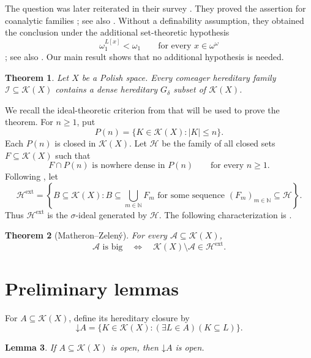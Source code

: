 \documentclass[10pt,a4paper]{amsart}
\newtheorem{theorem}{Theorem}[section]
\newtheorem{lemma}[theorem]{Lemma}
\newcommand{\K}{\mathcal K}
\newcommand{\HH}{\mathcal H}
\newcommand{\I}{\mathcal I}
\newcommand{\down}[1]{\mathord{\downarrow}\!#1}
\begin{document}
The question was later reiterated in their survey
\cite[Problem~6.9]{MZ07}. They proved the assertion for coanalytic families
\cite[Theorem~2.2]{MZ05}; see also \cite[Theorem~5.11]{MZ07}. Without a
definability assumption, they obtained the conclusion under the additional
set-theoretic hypothesis
\[
\omega_1^{L[x]}<\omega_1
\qquad\text{for every }x\in\omega^\omega
\]
\cite[Theorem~2.9]{MZ05}; see also \cite[Remark~5.12]{MZ07}.
Our main result shows that no additional hypothesis is needed.


\begin{theorem}\label{thm:main}
Let $X$ be a Polish space. Every comeager hereditary family
$\I\subseteq\K(X)$ contains a dense hereditary
$G_\delta$ subset of $\K(X)$.
\end{theorem}


We recall the ideal-theoretic criterion from \cite{MZ05} that will be used to
prove the theorem. For $n\geq1$, put
\[
P(n)=\{K\in\K(X):|K|\leq n\}.
\]
Each $P(n)$ is closed in $\K(X)$. Let $\HH$ be the family of all closed
sets $F\subseteq\K(X)$ such that
\[
F\cap P(n)\text{ is nowhere dense in }P(n)
\qquad\text{for every }n\geq1.
\]
Following \cite[Definition~2.3]{MZ05}, let
\[
\HH^{\mathrm{ext}}
=
\left\{
B\subseteq\K(X):
B\subseteq\bigcup_{m\in\mathbb N}F_m
\text{ for some sequence }(F_m)_{m\in\mathbb N}\subseteq\HH
\right\}.
\]
Thus $\HH^{\mathrm{ext}}$ is the $\sigma$-ideal generated by $\HH$.
The following characterization is \cite[Corollary~2.5]{MZ05}.

\begin{theorem}[Matheron--Zelený]\label{thm:MZcriterion}
For every $\mathcal A\subseteq\K(X)$,
\[
\mathcal A\text{ is big}
\quad\Longleftrightarrow\quad
\K(X)\setminus\mathcal A\in\HH^{\mathrm{ext}}.
\]
\end{theorem}

\section{Preliminary lemmas}

For $A\subseteq\K(X)$, define its hereditary closure by
\[
\down A
=
\{K\in\K(X): (\exists L \in A) (K\subseteq L)\}.
\]

\begin{lemma}\label{lem:open}
If $A\subseteq\K(X)$ is open, then $\down A$ is open.
\end{lemma}
\end{document}
